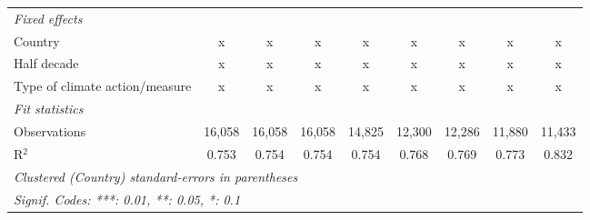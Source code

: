 \begin{table}[htbp]
\begin{tabular}{lcccccccc}
      \emph{Fixed effects}\\
      Country                                                                & x       & x       & x            & x            & x             & x             & x             & x\\  
      Half decade                                                            & x       & x       & x            & x            & x             & x             & x             & x\\  
      Type of climate action/measure                                         & x       & x       & x            & x            & x             & x             & x             & x\\  
      \midrule \emph{Fit statistics}\\
      Observations                                                           & 16,058  & 16,058  & 16,058       & 14,825       & 12,300        & 12,286        & 11,880        & 11,433\\  
      R$^2$                                                                  & 0.753   & 0.754   & 0.754        & 0.754        & 0.768         & 0.769         & 0.773         & 0.832\\  
      \midrule
      \multicolumn{9}{l}{\emph{Clustered (Country) standard-errors in parentheses}}\\
      \multicolumn{9}{l}{\emph{Signif. Codes: ***: 0.01, **: 0.05, *: 0.1}}\\
   \end{tabular}
\end{table}


